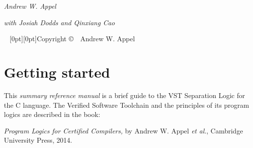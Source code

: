 \documentclass[12pt,fleqn,openany,oneside,showtrims]{memoir}
\begin{document}
\frontmatter
{}
\thispagestyle{empty}%
{
\centering
  \vspace*{4pc}%
  \fontsize{48}{48}\selectfont\par{}%

\vskip50pt
  \fontsize{20}{30}\selectfont\par{}%

\vskip50pt
  \fontsize{14}{16}\selectfont\par{}
\vskip100pt
\par
\vskip10pt
{\fontsize{24}{30}\selectfont\par\noindent%
{\itshape Andrew W. Appel}}\par
\vskip10pt
{\fontsize{16}{19}\selectfont\par\noindent%
{\centering \itshape with Josiah Dodds and Qinxiang Cao\\}}
}

~\vfill
\setlength{\parindent}{0pt}
\setlength{\parskip}{\baselineskip}
\clearpage
\raisebox{-7in}[0pt][0pt]{Copyright \copyright\ \the\year\ Andrew W. Appel}

\tableofcontents  %

\clearpage
\savepagenumber
\mainmatter
\restorepagenumber
\renewcommand{\chaptermark}[1]{\markboth{\thechapter.~#1\hfill{\textcolor{red}\thefile}\hspace*{2em}}{}}

\chapter{Getting started}

This \emph{summary reference manual} 
is a brief guide to the
VST Separation Logic for the C language.
The Verified Software Toolchain and
the principles of its program logics
are described in the book:

\noindent \emph{\large Program Logics for Certified Compilers,}\newline
by Andrew W. Appel \emph{et al.},
Cambridge University Press, 2014.  
\vspace{-2ex}
\end{document}
